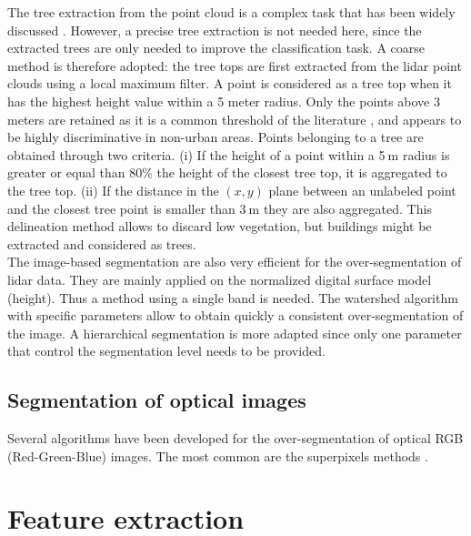 The tree extraction from the point cloud is a complex task that has been widely discussed \citep{dalponte2014tree, vega2014ptrees, kandare2014new}. However, a precise tree extraction is not needed here, since the extracted trees are only needed to improve the classification task. A coarse method is therefore adopted: the tree tops are first extracted from the lidar point clouds using a local maximum filter. A point is considered as a tree top when it has the highest height value within a 5 meter radius. Only the points above 3$\:$meters are retained as it is a common threshold of the literature \citep{eysn2012forest}, and appears to be highly discriminative in non-urban areas. Points belonging to a tree are obtained through two criteria. (i) If the height of a point within a 5$\:$m radius is greater or equal than 80\% the height of the closest tree top, it is aggregated to the tree top. (ii) If the distance in the  $(x,y)$ plane between an unlabeled point and the closest tree point is smaller than 3$\:$m  they are also aggregated. This delineation method allows to discard low vegetation, but buildings might be extracted and considered as trees. \\

The image-based segmentation are also very efficient for the over-segmentation of lidar data. They are mainly applied on the normalized digital surface model (height). Thus a method using a single band is needed. The watershed algorithm \citep{vincent1991watersheds} with specific parameters allow to obtain quickly a consistent over-segmentation of the image. A hierarchical segmentation \citep{guigues2006scale} is more adapted since only one parameter that control the segmentation level needs to be provided.

\subsection{Segmentation of optical images}
Several algorithms have been developed for the over-segmentation of optical RGB (Red-Green-Blue) images. The most common are the superpixels methods \citep{achanta2012slic}.

\section{Feature extraction}
